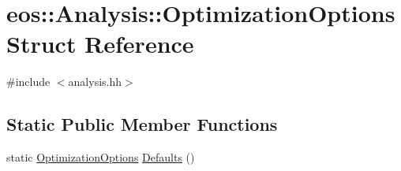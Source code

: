 \hypertarget{structeos_1_1Analysis_1_1OptimizationOptions}{
\section{eos::Analysis::OptimizationOptions Struct Reference}
\label{structeos_1_1Analysis_1_1OptimizationOptions}
}


{\ttfamily \#include $<$analysis.hh$>$}\subsection*{Static Public Member Functions}
\begin{DoxyCompactItemize}
\item 
static \hyperlink{structeos_1_1Analysis_1_1OptimizationOptions}{OptimizationOptions} \hyperlink{structeos_1_1Analysis_1_1OptimizationOptions_a809f9cf0f5d544c7303a631c278c3fa1}{Defaults} ()
\end{DoxyCompactItemize}
